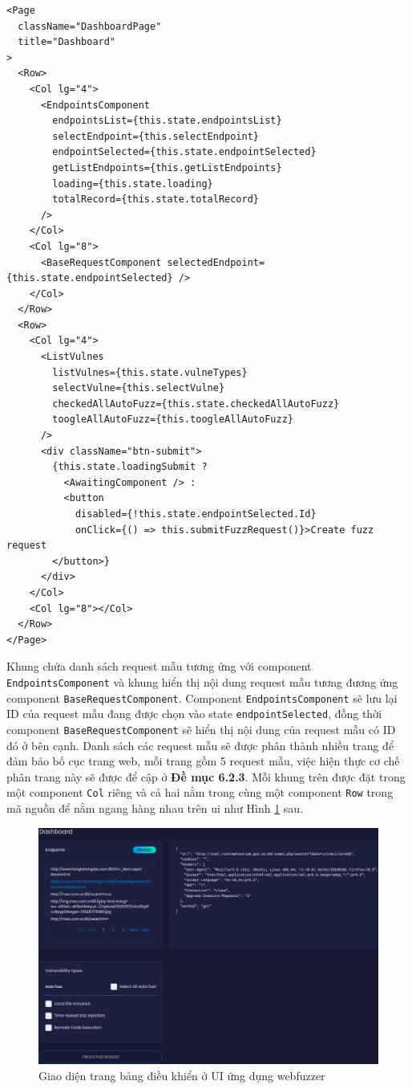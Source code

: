 \begin{lstlisting}[style=ES6, label={lst:implement-dashboard-page}, caption={Phương thức \texttt{render} của trang bảng điều khiển}]
<Page
  className="DashboardPage"
  title="Dashboard"
>
  <Row>
    <Col lg="4">
      <EndpointsComponent
        endpointsList={this.state.endpointsList}
        selectEndpoint={this.selectEndpoint}
        endpointSelected={this.state.endpointSelected}
        getListEndpoints={this.getListEndpoints}
        loading={this.state.loading}
        totalRecord={this.state.totalRecord}
      />
    </Col>
    <Col lg="8">
      <BaseRequestComponent selectedEndpoint={this.state.endpointSelected} />
    </Col>
  </Row>
  <Row>
    <Col lg="4">
      <ListVulnes
        listVulnes={this.state.vulneTypes}
        selectVulne={this.selectVulne}
        checkedAllAutoFuzz={this.state.checkedAllAutoFuzz}
        toogleAllAutoFuzz={this.toogleAllAutoFuzz}
      />
      <div className="btn-submit">
        {this.state.loadingSubmit ?
          <AwaitingComponent /> :
          <button
            disabled={!this.state.endpointSelected.Id}
            onClick={() => this.submitFuzzRequest()}>Create fuzz request
        </button>}
      </div>
    </Col>
    <Col lg="8"></Col>
  </Row>
</Page>
\end{lstlisting}
Khung chứa danh sách request mẫu tương ứng với component \texttt{EndpointsComponent} và khung hiển thị nội dung request mẫu tương đương ứng component \texttt{BaseRequestComponent}. Component \texttt{EndpointsComponent} sẽ lưu lại ID của request mẫu đang được chọn vào state \texttt{endpointSelected}, đồng thời component \texttt{BaseRequestComponent} sẽ hiển thị nội dung của request mẫu có ID đó ở bên cạnh. Danh sách các request mẫu sẽ được phân thành nhiều trang để đảm bảo bố cục trang web, mỗi trang gồm 5 request mẫu, việc hiện thực cơ chế phân trang này sẽ được để cập ở \textbf{Đề mục 6.2.3}. Mỗi khung trên được đặt trong một component \texttt{Col} riêng và cả hai nằm trong cùng một component \texttt{Row} trong mã nguồn để nằm ngang hàng nhau trên \acrshort{ui} như Hình \ref{fig:dashboard-ui} sau.
\FloatBarrier
\begin{figure}
    \centering
        \includegraphics[scale=0.45,keepaspectratio=true]{images/dashboard-ui.png}
    \caption{Giao diện trang bảng điều khiển ở UI ứng dụng webfuzzer}
    \label{fig:dashboard-ui}
\end{figure}
